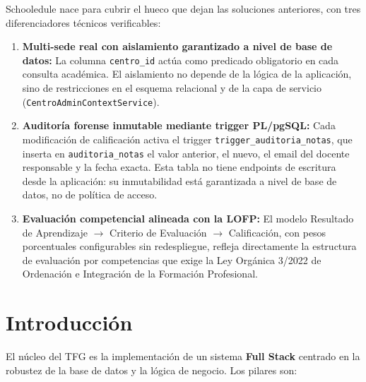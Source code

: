 \documentclass[12pt, a4paper]{report}
\begin{document}
Schooledule nace para cubrir el hueco que dejan las soluciones anteriores, con tres
diferenciadores técnicos verificables:

\begin{enumerate}
  \item \textbf{Multi-sede real con aislamiento garantizado a nivel de base de datos:}
        La columna \texttt{centro\_id} actúa como predicado obligatorio en cada consulta
        académica. El aislamiento no depende de la lógica de la aplicación, sino de
        restricciones en el esquema relacional y de la capa de servicio
        (\texttt{CentroAdminContextService}).

  \item \textbf{Auditoría forense inmutable mediante trigger PL/pgSQL:}
        Cada modificación de calificación activa el trigger
        \texttt{trigger\_auditoria\_notas}, que inserta en \texttt{auditoria\_notas}
        el valor anterior, el nuevo, el email del docente responsable y la fecha exacta.
        Esta tabla no tiene endpoints de escritura desde la aplicación: su
        inmutabilidad está garantizada a nivel de base de datos, no de política de
        acceso.

  \item \textbf{Evaluación competencial alineada con la LOFP:}
        El modelo Resultado de Aprendizaje \(\rightarrow\) Criterio de Evaluación
        \(\rightarrow\) Calificación, con pesos porcentuales configurables sin
        redespliegue, refleja directamente la estructura de evaluación por
        competencias que exige la Ley Orgánica 3/2022 de Ordenación e Integración
        de la Formación Profesional.
\end{enumerate}

\chapter{Introducción}

El núcleo del TFG es la implementación de un sistema \textbf{Full Stack} centrado en la robustez de la base de datos y la lógica de negocio. Los pilares son:
\end{document}
